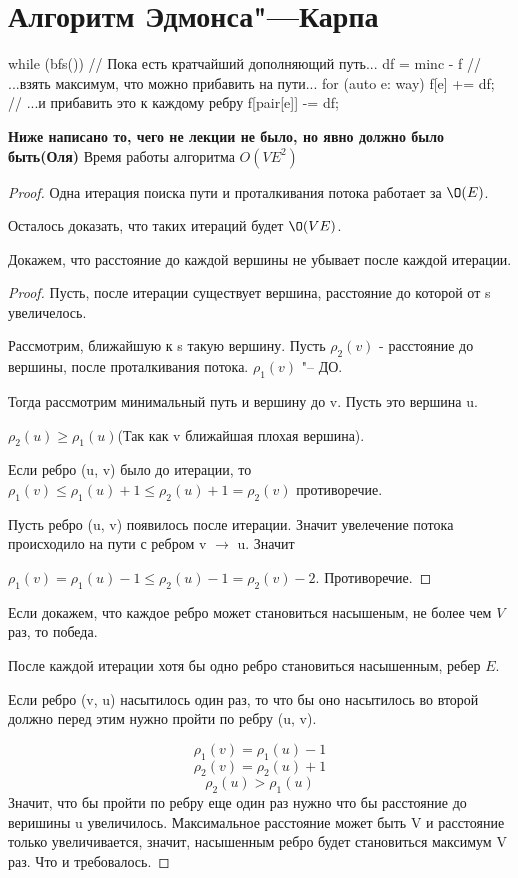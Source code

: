 \section{Алгоритм Эдмонса"---Карпа}

\begin{cppcode}
while (bfs()) {           // Пока есть кратчайший дополняющий путь...
	df = min{c - f}       // ...взять максимум, что можно прибавить на пути...
	for (auto e: way) {
		f[e] += df;       // ...и прибавить это к каждому ребру
		f[pair[e]] -= df;
	}
}
\end{cppcode}

\textbf{\Large Ниже написано то, чего не лекции не было, но явно должно было быть(Оля)}
Время работы алгоритма $O(VE^2)$
\begin{proof}
Одна итерация поиска пути и проталкивания потока работает за $\O(E)$.

Осталось доказать, что таких итераций будет $\O(VE)$.

Докажем, что расстояние до каждой вершины не убывает после каждой итерации. 
\begin{proof}
    Пусть, после итерации существует вершина, расстояние до которой от s увеличелось. 

    Рассмотрим, ближайшую к s такую вершину. Пусть $\rho_2(v)$ - расстояние до вершины, после
    проталкивания потока. $\rho_1(v)$ "-- ДО.

    Тогда рассмотрим минимальный путь и вершину до v. Пусть это вершина u.

    $\rho_2(u) \ge \rho_1(u)$(Так как v ближайшая плохая вершина).

    Если ребро (u, v) было до итерации, то $\rho_1(v) \le \rho_1(u) + 1 \le \rho_2(u) + 1 = \rho_2(v)$  противоречие.

    Пусть ребро (u, v) появилось после итерации. Значит увелечение потока происходило на пути 
    с ребром v $\to$ u. Значит
    
    $\rho_1(v) = \rho_1(u) - 1 \le \rho_2(u) - 1 = \rho_2(v) - 2$. Противоречие.
\end{proof}

    Если докажем, что каждое ребро может становиться насышеным, не более чем $V$ раз, то
    победа.
    
    После каждой итерации хотя бы одно ребро становиться насышенным, ребер $E$.

    Если ребро (v, u) насытилось один раз, то что бы оно насытилось во второй должно 
    перед этим нужно пройти по ребру (u, v).

    $$\rho_1(v) = \rho_1(u) - 1$$
    $$\rho_2(v) = \rho_2(u) + 1$$
    $$\rho_2(u) > \rho_1(u)$$
    Значит, что бы пройти по ребру еще один раз нужно что бы расстояние до веришины u увеличилось. 
    Максимальное расстояние может быть V и расстояние только увеличивается, значит, насышенным
    ребро будет становиться максимум V раз. Что и требовалось.  
\end{proof}

